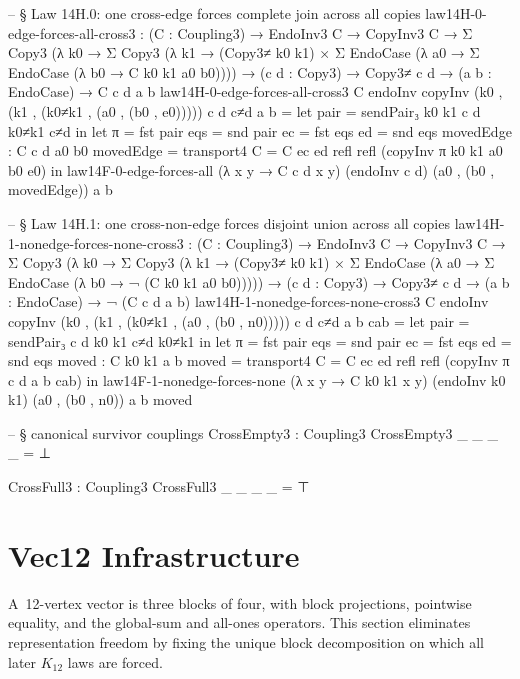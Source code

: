 \documentclass[11pt,a4paper]{book}
\def\texorpdfstring#1#2{#2}%
\begin{document}
\begin{code}
-- § Law 14H.0: one cross-edge forces complete join across all copies
law14H-0-edge-forces-all-cross3 : (C : Coupling3) → EndoInv3 C → CopyInv3 C →
  Σ Copy3 (λ k0 → Σ Copy3 (λ k1 → (Copy3≠ k0 k1) × Σ EndoCase (λ a0 → Σ EndoCase (λ b0 → C k0 k1 a0 b0)))) →
  (c d : Copy3) → Copy3≠ c d → (a b : EndoCase) → C c d a b
law14H-0-edge-forces-all-cross3 C endoInv copyInv (k0 , (k1 , (k0≠k1 , (a0 , (b0 , e0))))) c d c≠d a b =
  let
    pair = sendPair₃ k0 k1 c d k0≠k1 c≠d
  in
  let
    π = fst pair
    eqs = snd pair
    ec = fst eqs
    ed = snd eqs
    movedEdge : C c d a0 b0
    movedEdge = transport4 {C = C} ec ed refl refl (copyInv π k0 k1 a0 b0 e0)
  in
  law14F-0-edge-forces-all (λ x y → C c d x y) (endoInv c d) (a0 , (b0 , movedEdge)) a b

-- § Law 14H.1: one cross-non-edge forces disjoint union across all copies
law14H-1-nonedge-forces-none-cross3 : (C : Coupling3) → EndoInv3 C → CopyInv3 C →
  Σ Copy3 (λ k0 → Σ Copy3 (λ k1 → (Copy3≠ k0 k1) × Σ EndoCase (λ a0 → Σ EndoCase (λ b0 → ¬ (C k0 k1 a0 b0))))) →
  (c d : Copy3) → Copy3≠ c d → (a b : EndoCase) → ¬ (C c d a b)
law14H-1-nonedge-forces-none-cross3 C endoInv copyInv (k0 , (k1 , (k0≠k1 , (a0 , (b0 , n0))))) c d c≠d a b cab =
  let
    pair = sendPair₃ c d k0 k1 c≠d k0≠k1
  in
  let
    π = fst pair
    eqs = snd pair
    ec = fst eqs
    ed = snd eqs
    moved : C k0 k1 a b
    moved = transport4 {C = C} ec ed refl refl (copyInv π c d a b cab)
  in
  law14F-1-nonedge-forces-none (λ x y → C k0 k1 x y) (endoInv k0 k1) (a0 , (b0 , n0)) a b moved

-- § canonical survivor couplings
CrossEmpty3 : Coupling3
CrossEmpty3 _ _ _ _ = ⊥

CrossFull3 : Coupling3
CrossFull3 _ _ _ _ = ⊤
\end{code}

\section{Vec\texorpdfstring{$_{12}$}{12} Infrastructure}

A~12-vertex vector is three blocks of four, with block projections,
pointwise equality, and the global-sum and all-ones operators.  This section
eliminates representation freedom by fixing the unique block decomposition on
which all later $K_{12}$ laws are forced.
\end{document}
